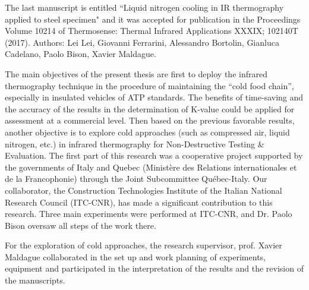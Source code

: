 The last manuscript is entitled ``Liquid nitrogen cooling in IR thermography applied to steel specimen" and it was accepted for publication in the Proceedings Volume 10214 of Thermosense: Thermal Infrared Applications XXXIX; 102140T (2017). Authors: Lei Lei, Giovanni Ferrarini, Alessandro Bortolin, Gianluca Cadelano, Paolo Bison, Xavier Maldague.

The main objectives of the present thesis are first to deploy the infrared thermography technique in the procedure of maintaining the ``cold food chain'', especially in insulated vehicles of ATP standards. The benefits of time-saving and the accuracy of the results in the determination of K-value could be applied for assessment at a commercial level. Then based on the previous favorable results, another objective is to explore cold approaches (such as compressed air, liquid nitrogen, etc.) in infrared thermography for Non-Destructive Testing \& Evaluation. The first part of this research was a cooperative project supported by the governments of Italy and Quebec (Ministère des Relations internationales et de la Francophonie) through the Joint Subcommittee Québec-Italy. Our collaborator, the Construction Technologies Institute of the Italian National Research Council (ITC-CNR), has made a significant contribution to this research. Three main experiments were performed at ITC-CNR, and Dr. Paolo Bison oversaw all steps of the work there.

For the exploration of cold approaches, the research supervisor, prof. Xavier Maldague collaborated in the set up and work planning of experiments, equipment and participated in the interpretation of the results and the revision of the manuscripts.



